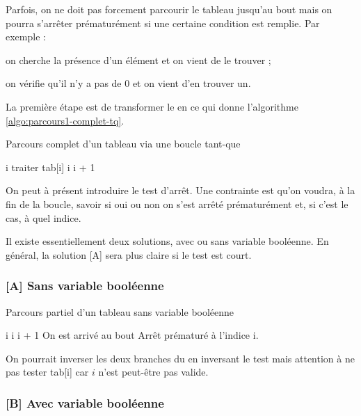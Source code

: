 Parfois, on ne doit pas forcement parcourir le tableau jusqu'au bout
mais on pourra s'arrêter prématurément si une certaine condition est remplie.
Par exemple :
\begin{liste}
\item on cherche la présence d'un élément et on vient de le trouver ;
\item on vérifie qu'il n'y a pas de $0$ et on vient d'en trouver un.
\end{liste}

La première étape est de transformer le  en 
ce qui donne l'algorithme \vref{algo:parcours1-complet-tq}.

\begin{algorithm}[H]
\begin{pseudo}
	\caption{Parcours complet d'un tableau via une boucle tant-que}
	\label{algo:parcours1-complet-tq}
	\Let i 
		\Stmt traiter tab[i]
		\Let i \Gets i + 1
	\EndWhile
\end{pseudo}
\end{algorithm}

On peut à présent introduire le test d'arrêt.
Une contrainte est qu'on voudra, à la fin de la boucle, savoir
si oui ou non on s'est arrêté prématurément et, si c'est le cas,
à quel indice.

Il existe essentiellement deux solutions, avec ou sans variable booléenne.
En général, la solution [A] sera plus claire si le test est court.

\subsubsection*{[A] Sans variable booléenne}

\begin{algorithm}[H]
\begin{pseudo}
	\caption{Parcours partiel d'un tableau sans variable booléenne}
	\label{algo:parcours1-partiel-sans-bool}
	\Let i 
		\Let i \Gets i + 1
	\EndWhile
		\LComment On est arrivé au bout
	\Else
		\LComment Arrêt prématuré à l'indice i.
	\EndIf
\end{pseudo}
\end{algorithm}

On pourrait inverser les deux branches du  en inversant le test
mais attention à ne pas tester tab[i] car $i$ n'est peut-être pas valide.

\subsubsection*{[B] Avec variable booléenne}

